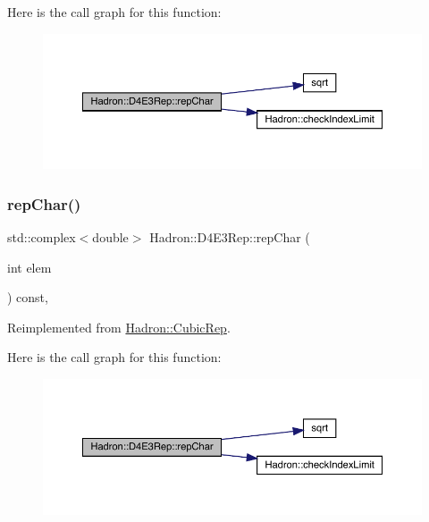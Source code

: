 Here is the call graph for this function\+:
\nopagebreak
\begin{figure}[H]
\begin{center}
\leavevmode
\includegraphics[width=350pt]{dc/d81/structHadron_1_1D4E3Rep_afd42741649d0a7906d6232710f1522aa_cgraph}
\end{center}
\end{figure}
\mbox{\label{structHadron_1_1D4E3Rep_afd42741649d0a7906d6232710f1522aa}} 
\subsubsection{\texorpdfstring{repChar()}{repChar()}\hspace{0.1cm}{\footnotesize\ttfamily [2/2]}}
{\footnotesize\ttfamily std\+::complex$<$double$>$ Hadron\+::\+D4\+E3\+Rep\+::rep\+Char (\begin{DoxyParamCaption}\item[{int}]{elem }\end{DoxyParamCaption}) const\hspace{0.3cm}{\ttfamily [inline]}, {\ttfamily [virtual]}}



Reimplemented from \mbox{\hyperlink{structHadron_1_1CubicRep_af45227106e8e715e84b0af69cd3b36f8}{Hadron\+::\+Cubic\+Rep}}.

Here is the call graph for this function\+:
\nopagebreak
\begin{figure}[H]
\begin{center}
\leavevmode
\includegraphics[width=350pt]{dc/d81/structHadron_1_1D4E3Rep_afd42741649d0a7906d6232710f1522aa_cgraph}
\end{center}
\end{figure}
\mbox{\label{structHadron_1_1D4E3Rep_a313affd6d58648cb82e7095ada7afa8d}} 
